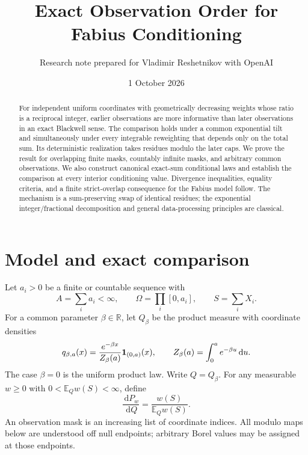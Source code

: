 \documentclass[11pt,a4paper]{article}
\title{Exact Observation Order for Fabius Conditioning}
\author{Research note prepared for Vladimir Reshetnikov with OpenAI}
\date{1 October 2026}
\theoremstyle{remark}\newtheorem*{ednote}{Editorial note (ProveIt, 2026-10-01)}
\newcommand{\E}{\mathbb E}\newcommand{\N}{\mathbb N}\newcommand{\R}{\mathbb R}
\newcommand{\dd}{\,\mathrm d}\newcommand{\ii}{\mathrm i}
\begin{document}
\maketitle
\begin{abstract}
For independent uniform coordinates with geometrically decreasing weights whose ratio is a reciprocal integer, earlier observations are more informative than later observations in an exact Blackwell sense. The comparison holds under a common exponential tilt and simultaneously under every integrable reweighting that depends only on the total sum. Its deterministic realization takes residues modulo the later caps. We prove the result for overlapping finite masks, countably infinite masks, and arbitrary common observations. We also construct canonical exact-sum conditional laws and establish the comparison at every interior conditioning value. Divergence inequalities, equality criteria, and a finite strict-overlap consequence for the Fabius model follow. The mechanism is a sum-preserving swap of identical residues; the exponential integer/fractional decomposition and general data-processing principles are classical.
\end{abstract}

\section{Model and exact comparison}
Let $a_i>0$ be a finite or countable sequence with
\[
 A=\sum_i a_i<\infty,\qquad
 \Omega=\prod_i[0,a_i],\qquad S=\sum_iX_i.
\]
For a common parameter $\beta\in\R$, let $Q_\beta$ be the product measure with coordinate densities
\begin{equation}\label{eq:reference}
 q_{\beta,a}(x)=\frac{e^{-\beta x}}{Z_\beta(a)}\ind_{(0,a)}(x),
 \qquad Z_\beta(a)=\int_0^a e^{-\beta u}\dd u.
\end{equation}
The case $\beta=0$ is the uniform product law. Write $Q=Q_\beta$. For any measurable $w\ge0$ with $0<\E_Qw(S)<\infty$, define
\begin{equation}\label{eq:reweight}
 \frac{\dd P_w}{\dd Q}=\frac{w(S)}{\E_Qw(S)}.
\end{equation}
An observation mask is an increasing list of coordinate indices. All modulo maps below are understood off null endpoints; arbitrary Borel values may be assigned at those endpoints.
\end{document}
